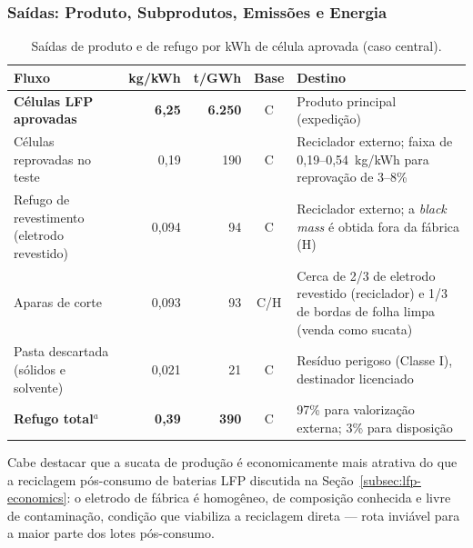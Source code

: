 \subsubsection{Saídas: Produto, Subprodutos, Emissões e Energia}

\begin{table}[H]
\centering
\caption{Saídas de produto e de refugo por kWh de célula aprovada (caso central).}
\label{tab:giga-saidas}
\small
\renewcommand{\arraystretch}{1.15}
\begin{tabularx}{\textwidth}{@{} >{\raggedright\arraybackslash}p{4.4cm} r r c X @{}}
\toprule
\textbf{Fluxo} & \textbf{kg/kWh} & \textbf{t/GWh} & \textbf{Base} & \textbf{Destino} \\
\midrule
\textbf{Células LFP aprovadas} & \textbf{6,25} & \textbf{6.250} & C & Produto principal (expedição) \\
Células reprovadas no teste & 0,19 & 190 & C & Reciclador externo; faixa de 0,19--0,54~kg/kWh para reprovação de 3--8\% \\
Refugo de revestimento (eletrodo revestido) & 0,094 & 94 & C & Reciclador externo; a \textit{black mass} é obtida fora da fábrica (H) \\
Aparas de corte & 0,093 & 93 & C/H & Cerca de 2/3 de eletrodo revestido (reciclador) e 1/3 de bordas de folha limpa (venda como sucata) \\
Pasta descartada (sólidos e solvente) & 0,021 & 21 & C & Resíduo perigoso (Classe I), destinador licenciado \\
\midrule
\textbf{Refugo total}$^{a}$ & \textbf{0,39} & \textbf{390} & C & 97\% para valorização externa; 3\% para disposição \\
\bottomrule
\end{tabularx}
\par{}
\end{table}

Cabe destacar que a sucata de produção é economicamente mais atrativa do que a
reciclagem pós-consumo de baterias LFP discutida na
Seção~\ref{subsec:lfp-economics}: o eletrodo de fábrica é homogêneo, de
composição conhecida e livre de contaminação, condição que viabiliza a
reciclagem direta — rota inviável para a maior parte dos lotes pós-consumo.

